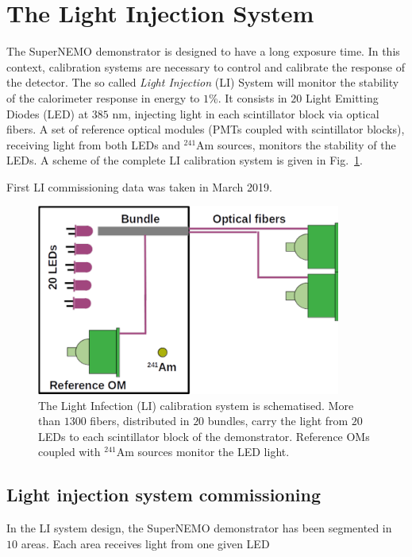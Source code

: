 \section{The Light Injection System}
\label{sec:LIS}

The SuperNEMO demonstrator is designed to have a long exposure time.
In this context, calibration systems are necessary to control and calibrate the response of the detector.
The so called \emph{Light Injection} (LI) System will monitor the stability of the calorimeter response in energy to $1$\%.
It consists in $20$ Light Emitting Diodes (LED) at $385$ nm, injecting light in each scintillator block via optical fibers.
A set of reference optical modules (PMTs coupled with scintillator blocks), receiving light from both LEDs and $^{241}$Am sources, monitors the stability of the LEDs.
A scheme of the complete LI calibration system is given in Fig.~\ref{fig:LIS_scheme}.

First LI commissioning data was taken in March 2019.



\begin{figure}[h]
  \centering
  \includegraphics[width=10cm]{commissioning/fig_commissioning/LIS_scheme.pdf}
  \caption{The Light Infection (LI) calibration system is schematised.
    More than $1300$ fibers, distributed in $20$ bundles, carry the light from $20$ LEDs to each scintillator block of the demonstrator.
    Reference OMs coupled with $^{241}$Am sources monitor the LED light.
    \label{fig:LIS_scheme}}
\end{figure}

\subsection{Light injection system commissioning}


In the LI system design, the SuperNEMO demonstrator has been segmented in $10$ areas.
Each area receives light from one given LED

